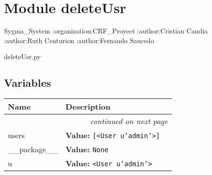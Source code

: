 %
%
%


\section{Module deleteUsr}

    \label{deleteUsr}
Sygma\_System :organization:CRF\_Proyect :author:Cristian Candia 
:author:Ruth Centurion :author:Fernando Saucedo

deleteUsr.py



  \subsection{Variables}

    \vspace{-1cm}
\hspace{\varindent}\begin{longtable}{|p{\varnamewidth}|p{\vardescrwidth}|l}
\cline{1-2}
\cline{1-2} \centering \textbf{Name} & \centering \textbf{Description}& \\
\cline{1-2}
\endhead\cline{1-2}\multicolumn{3}{r}{\small\textit{continued on next page}}\\\endfoot\cline{1-2}
\endlastfoot\raggedright u\-s\-e\-r\-s\- & \raggedright \textbf{Value:} 
{\tt \texttt{[}{\textless}User u'admin'{\textgreater}\texttt{]}}&\\
\cline{1-2}
\raggedright \_\-\_\-p\-a\-c\-k\-a\-g\-e\-\_\-\_\- & \raggedright \textbf{Value:} 
{\tt None}&\\
\cline{1-2}
\raggedright u\- & \raggedright \textbf{Value:} 
{\tt {\textless}User u'admin'{\textgreater}}&\\
\cline{1-2}
\end{longtable}


